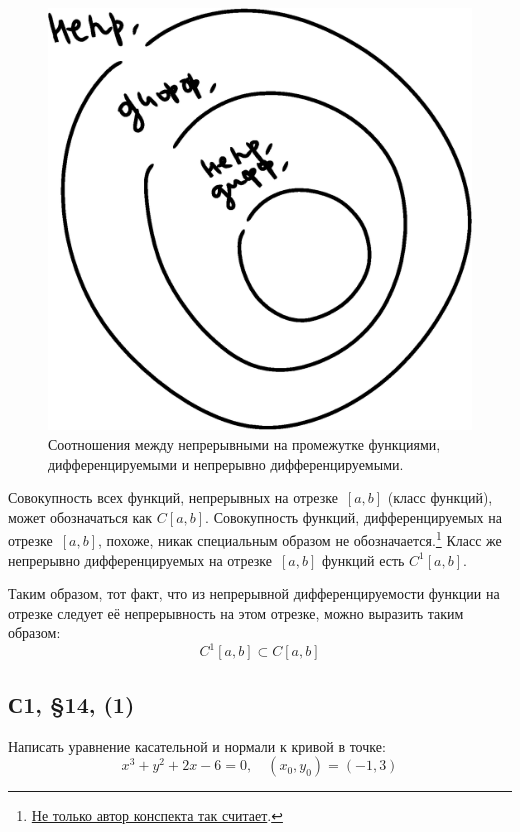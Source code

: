 \documentclass[a4paper,12pt]{article}
\begin{document}
\begin{solution}
\begin{remark}
      \begin{figure}[ht]
          \centering
          
          \includegraphics[width=0.3\linewidth]{images/function-circles}
          
          \caption{Соотношения между непрерывными на промежутке функциями, дифференцируемыми и непрерывно дифференцируемыми.}  %
          \label{fig:function-circles}
      \end{figure}

      Совокупность всех функций, непрерывных на отрезке~$[a, b]$ (класс функций), может обозначаться как $C[a, b]$.
      Совокупность функций, дифференцируемых на отрезке~$[a, b]$, похоже, никак специальным образом не обозначается.\footnote{
        \href{https://math.stackexchange.com/questions/4450788/space-of-differentiable-functions\#comment9321095_4450788}{Не только автор конспекта так считает}.
      }
      Класс же непрерывно дифференцируемых на отрезке~$[a, b]$ функций есть $C^1[a, b]$.

      Таким образом, тот факт, что из непрерывной дифференцируемости функции на отрезке следует её непрерывность на этом отрезке, можно выразить таким образом:
      \[
        C^1[a, b] \subset C[a, b]
      \]
    \end{remark}
  \end{solution}


  \subsection{С1, \S 14, (1)}

  Написать уравнение касательной и нормали к кривой в точке:
  \begin{equation}\label{eq:1-14-10(1)}
    x^3 + y^2 + 2x - 6 = 0,\quad (x_0, y_0) = (-1, 3)
  \end{equation}
  
\end{document}
